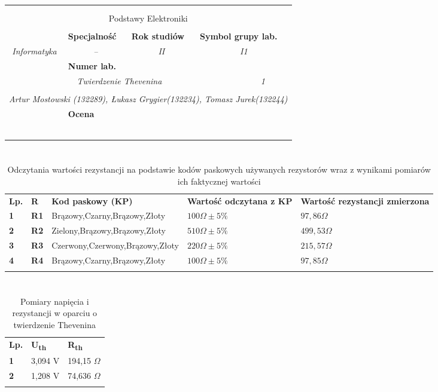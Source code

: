 \documentclass[polish,polish,a4paper]{article}
\newcommand{\PRzFieldDsc}[1]{\sffamily\bfseries\scriptsize #1}
\newcommand{\PRzFieldCnt}[1]{\textit{#1}}
\newcommand{\PRzHeading}[8]{

\begin{center}
\begin{tabular}{ p{0.32\textwidth} p{0.15\textwidth} p{0.15\textwidth} p{0.12\textwidth} p{0.12\textwidth} }

  &   &   &   &   \\
\Xhline{0.8pt}
\multicolumn{5}{|c|}{}\\[-1ex]
\multicolumn{5}{|c|}{{\LARGE #1}}\\
\multicolumn{5}{|c|}{}\\[-1ex]

\Xhline{0.8pt}
\multicolumn{1}{|l|}{\PRzFieldDsc{Kierunek}}	& \multicolumn{1}{|l|}{\PRzFieldDsc{Specjalność}}	& \multicolumn{1}{|l|}{\PRzFieldDsc{Rok studiów}}	& \multicolumn{2}{|l|}{\PRzFieldDsc{Symbol grupy lab.}} \\
\multicolumn{1}{|c|}{\PRzFieldCnt{#2}}		& \multicolumn{1}{|c|}{\PRzFieldCnt{#3}}		& \multicolumn{1}{|c|}{\PRzFieldCnt{#4}}		& \multicolumn{2}{|c|}{\PRzFieldCnt{#5}} \\

\Xhline{0.8pt}
\multicolumn{4}{|l|}{\PRzFieldDsc{Temat Laboratorium}}		& \multicolumn{1}{|l|}{\PRzFieldDsc{Numer lab.}} \\
\multicolumn{4}{|c|}{\PRzFieldCnt{#6}}				& \multicolumn{1}{|c|}{\PRzFieldCnt{#7}} \\

\Xhline{0.8pt}
\multicolumn{5}{|l|}{\PRzFieldDsc{Skład grupy ćwiczeniowej oraz numery indeksów}}\\
\multicolumn{5}{|c|}{\PRzFieldCnt{#8}}\\

\Xhline{0.8pt}
\multicolumn{3}{|l|}{\PRzFieldDsc{Uwagi}}	& \multicolumn{2}{|l|}{\PRzFieldDsc{Ocena}} \\
\multicolumn{3}{|c|}{\PRzFieldCnt{\ }}		& \multicolumn{2}{|c|}{\PRzFieldCnt{\ }} \\

\Xhline{0.8pt}
\end{tabular}
\end{center}
}
\begin{document}
\PRzHeading{Podstawy Elektroniki}{Informatyka}{--}{II}{I1}{Twierdzenie Thevenina}{1}{Artur Mostowski (132289), Łukasz Grygier(132234), Tomasz Jurek(132244)}{}
\section{}%
\section{}%
\begin{table}[!h]
\centering
\begin{tabular}{|y|l|l|l|l|}
\Xhline{0.8pt}
\textbf{Lp.}
& 
\textbf{R}
&
\textbf{Kod paskowy (KP)}
&
\textbf{Wartość odczytana z KP}
&
\textbf{Wartość rezystancji zmierzona}
\\
\Xhline{0.8pt}
\textbf{1}
& 
\textbf{R1}
&
{Brązowy,Czarny,Brązowy,Złoty}
&
{$100 \Omega \pm 5\%$}
&
{$97,86 \Omega$}
\\
\Xhline{0.8pt}\textbf{2}
& 
\textbf{R2}
&

{Zielony,Brązowy,Brązowy,Złoty}
&
{$510 \Omega \pm 5\%$}
&
{$499,53 \Omega$}
\\
\Xhline{0.8pt}
\textbf{3}
& 
\textbf{R3}
&
{Czerwony,Czerwony,Brązowy,Złoty}
&
{$220 \Omega \pm 5\%$}
&
{$215,57 \Omega$}
\\
\Xhline{0.8pt}\textbf{4}
& 
\textbf{R4}
&
{Brązowy,Czarny,Brązowy,Złoty}
&
{$100 \Omega \pm 5\%$}
&
{$97,85 \Omega$}
\\
\Xhline{0.8pt}
\end{tabular}
\caption{Odczytania wartości rezystancji na podstawie kodów paskowych używanych rezystorów wraz z wynikami pomiarów ich faktycznej wartości }
\end{table}
\section{}%
\begin{table}[!h]
\centering
\begin{tabular}{|y|l|l|}
\Xhline{0.8pt}
\textbf{Lp.}
& 
\textbf{U\textsubscript{th}}
&
\textbf{R\textsubscript{th}}
\\
\Xhline{0.8pt}\textbf{1}
& 
3,094 V
&
194,15 $\Omega$
\\
\Xhline{0.8pt}\textbf{2}
& 
1,208 V
&
74,636 $\Omega$ 
\\
\Xhline{0.8pt}
\end{tabular}

\caption{Pomiary napięcia i rezystancji w oparciu o twierdzenie Thevenina}
\end{table}
\end{document}
